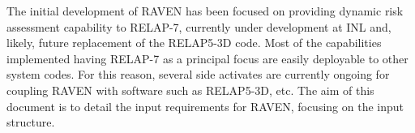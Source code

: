 The initial development of RAVEN has been focused on providing dynamic risk assessment capability to RELAP-7, currently under development at INL and, likely, future replacement of the RELAP5-3D code.
%
Most of the capabilities implemented having RELAP-7 as a principal focus are easily deployable to other system codes.
%
For this reason, several side activates are currently ongoing for coupling RAVEN with software such as RELAP5-3D, etc.
%
The aim of this document is to detail the input requirements for RAVEN, focusing on the input structure.
